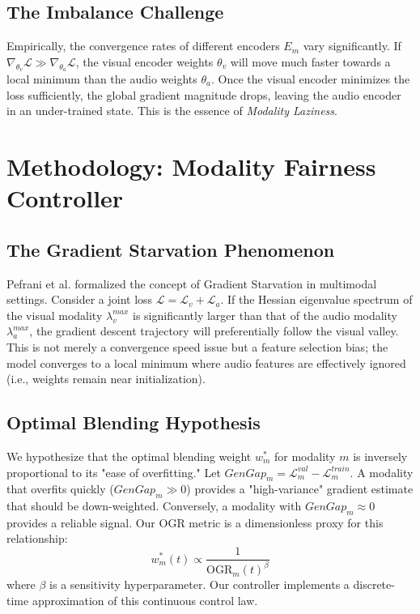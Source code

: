 \documentclass[10pt, twocolumn, letterpaper]{article}
\begin{document}
\subsection{The Imbalance Challenge}
Empirically, the convergence rates of different encoders $E_m$ vary significantly. If $\nabla_{\theta_v} \mathcal{L} \gg \nabla_{\theta_a} \mathcal{L}$, the visual encoder weights $\theta_v$ will move much faster towards a local minimum than the audio weights $\theta_a$. Once the visual encoder minimizes the loss sufficiently, the global gradient magnitude drops, leaving the audio encoder in an under-trained state. This is the essence of \textit{Modality Laziness}.

\section{Methodology: Modality Fairness Controller}

\subsection{The Gradient Starvation Phenomenon}
Pefrani et al. \cite{gradient_starvation} formalized the concept of Gradient Starvation in multimodal settings. Consider a joint loss $\mathcal{L} = \mathcal{L}_v + \mathcal{L}_a$. If the Hessian eigenvalue spectrum of the visual modality $\lambda_v^{max}$ is significantly larger than that of the audio modality $\lambda_a^{max}$, the gradient descent trajectory will preferentially follow the visual valley. This is not merely a convergence speed issue but a feature selection bias; the model converges to a local minimum where audio features are effectively ignored (i.e., weights remain near initialization).

\subsection{Optimal Blending Hypothesis}
We hypothesize that the optimal blending weight $w_m^*$ for modality $m$ is inversely proportional to its "ease of overfitting." Let $GenGap_m = \mathcal{L}^{val}_m - \mathcal{L}^{train}_m$. A modality that overfits quickly ($GenGap_m \gg 0$) provides a "high-variance" gradient estimate that should be down-weighted. Conversely, a modality with $GenGap_m \approx 0$ provides a reliable signal. Our OGR metric is a dimensionless proxy for this relationship:
\begin{equation}
    w_m^*(t) \propto \frac{1}{\text{OGR}_m(t)^\beta}
\end{equation}
where $\beta$ is a sensitivity hyperparameter. Our controller implements a discrete-time approximation of this continuous control law.
\end{document}
